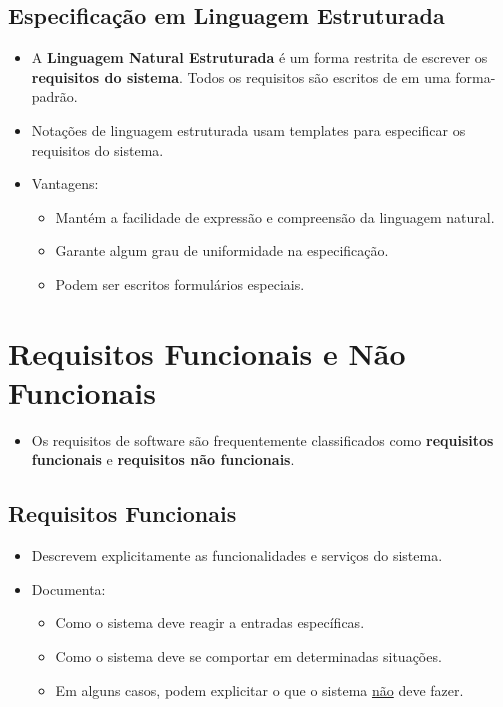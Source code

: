 \documentclass[a4paper, 11pt]{article}
\begin{document}
\subsection{Especificação em Linguagem Estruturada}
\begin{itemize}
	\item A \textbf{Linguagem Natural Estruturada} é um forma restrita de escrever os \textbf{requisitos do sistema}. Todos os requisitos são 
	escritos de em uma forma-padrão.
	\item Notações de linguagem estruturada usam templates para especificar os requisitos do sistema.
	\item Vantagens:
	\begin{itemize}
		\item Mantém a facilidade de expressão e compreensão da linguagem natural.
		\item Garante algum grau de uniformidade na especificação.
		\item Podem ser escritos formulários especiais.
	\end{itemize}
\end{itemize}

\section{Requisitos Funcionais e Não Funcionais}
\begin{itemize}
	\item Os requisitos de software são frequentemente classificados como \textbf{requisitos funcionais} e \textbf{requisitos não funcionais}.
\end{itemize}

\subsection{Requisitos Funcionais}
\begin{itemize}
	\item Descrevem explicitamente as funcionalidades e serviços do sistema.
	\item Documenta:
	\begin{itemize}
		\item Como o sistema deve reagir a entradas específicas.
		\item Como o sistema deve se comportar em determinadas situações.
		\item Em alguns casos, podem explicitar o que o sistema \underline{não} deve fazer.
	\end{itemize}
\end{itemize}
\end{document}
